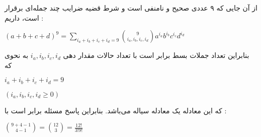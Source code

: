 از آن جایی که ۹ عددی صحیح و نا‌منفی است و شرط قضیه ضرایب چند جمله‌ای برقرار است، داریم :
\begin{center}
  $(a + b + c + d)^9 = \sum\limits_{i_a+i_b+i_c+i_d=9} \binom{9}{i_a,i_b,i_c,i_d} a^{i_a} b^{i_b} c^{i_c} d^{i_d}$
\end{center}
بنابراین تعداد جملات بسط برابر است با تعداد حالات مقدار دهی
$i_a,i_b,i_c,i_d$
به نحوی که
\begin{center}
  $i_a+i_b+i_c+i_d=9$
  
  $(i_a,i_b,i_c,i_d \geq 0)$
\end{center}
که این معادله یک معادله سیاله می‌باشد. بنابراین پاسخ مسئله برابر است با :
\begin{center}
  $\binom{9 + 4 - 1}{4 - 1} = \binom{12}{3} = \frac{12!}{3!9!}$
\end{center}  
